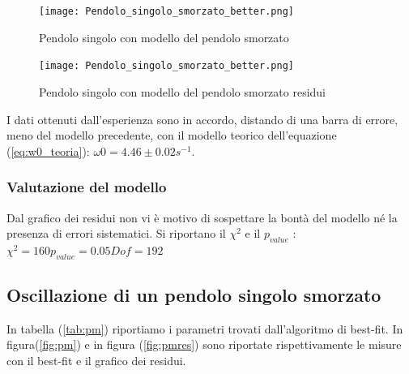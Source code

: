 \documentclass{article}
\begin{document}
                 \begin{figure}[h! ]
                    \centering
                    \texttt{[image: Pendolo\_singolo\_smorzato\_better.png]}
                    \caption{Pendolo singolo con modello del pendolo smorzato}
                    \label{fig:psbetter}
                \end{figure}
    
                \begin{figure}[h! ]
                    \centering
                    \texttt{[image: Pendolo\_singolo\_smorzato\_better.png]}
                    \caption{Pendolo singolo con modello del pendolo smorzato residui }
                    \label{fig:psresbetter}
                \end{figure}

            I dati ottenuti dall'esperienza sono in accordo, distando di  una barra di errore, meno del modello precedente, con il modello teorico dell'equazione (\ref{eq:w0_teoria}):  $\omega0=4.46 \pm 0.02 s^{-1}$.
        

            \subsubsection{Valutazione del modello}
            
             Dal grafico dei residui non vi è motivo di sospettare la bontà del modello né la presenza di errori sistematici.
             Si riportano il $\chi^2$ e il $p_{value}$ : $\chi^2= 160 p_{value}= 0.05 Dof= 192 $
             

           



		\subsection{  Oscillazione di un pendolo singolo smorzato }
    In tabella (\ref{tab:pm}) riportiamo i parametri trovati dall'algoritmo di best-fit.
              In figura(\ref{fig:pm}) e in figura (\ref{fig:pmres}) sono riportate rispettivamente  le misure con il best-fit e il grafico dei residui. 
               
\end{document}
